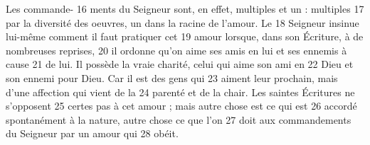 Les commande-	 
16	 	ments du Seigneur sont, en effet, multiples et un : multiples	 
17	 	par la diversité des oeuvres, un dans la racine de l'amour. Le	 
18	 	Seigneur insinue lui-même comment il faut pratiquer cet	 
19	 	amour lorsque, dans son Écriture, à de nombreuses reprises,	 
20	 	il ordonne qu'on aime ses amis en lui et ses ennemis à cause	 
21	 	de lui. Il possède la vraie charité, celui qui aime son ami en	 
22	 	Dieu et son ennemi pour Dieu. Car il est des gens qui	 
23	 	aiment leur prochain, mais d'une affection qui vient de la	 
24	 	parenté et de la chair. Les saintes Écritures ne s'opposent	 
25	 	certes pas à cet amour ; mais autre chose est ce qui est	 
26	 	accordé spontanément à la nature, autre chose ce que l'on	 
27	 	doit aux commandements du Seigneur par un amour qui	 
28	 	obéit.